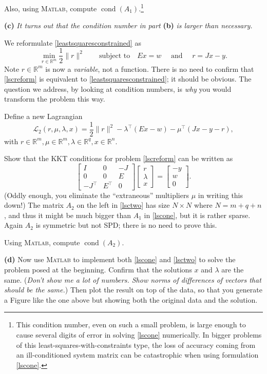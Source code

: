 \documentclass[12pt,reqno]{amsart}
\newcommand{\RR}{\mathbb{R}}
\newcommand{\cond}{\operatorname{cond}}
\newcommand{\Matlab}{\textsc{Matlab}\xspace}
\newcommand{\epart}[1]{\medskip\noindent\textbf{(#1)}\quad }
\begin{document}
Also, using \Matlab, compute $\cond(A_1)$.\footnote{This condition number, even on such a small problem, is large enough to cause several digits of error in solving \eqref{lscone} numerically.  In bigger problems of this least-squares-with-constraints type, the loss of accuracy coming from an ill-conditioned system matrix can be catastrophic when using formulation \eqref{lscone}.}

\epart{c}  \emph{It turns out that the condition number in part} \textbf{(b)} \emph{is larger than necessary.}

We reformulate \eqref{leastsquaresconstrained} as
\begin{equation}
    \min_{r\in\RR^m} \frac{1}{2} \|r\|^2 \qquad \text{subject to} \quad E x = w \quad \text{ and } \quad r = J x - y. \label{lscreform}
\end{equation}
Note $r\in \RR^m$ is now a \emph{variable}, not a function.  There is no need to confirm that \eqref{lscreform} is equivalent to \eqref{leastsquaresconstrained}; it should be obvious.  The question we address, by looking at condition numbers, is \emph{why} you would transform the problem this way.

Define a new Lagrangian
    $$\mathcal{L}_2(r,\mu,\lambda,x) = \frac{1}{2} \|r\|^2 - \lambda^\top \left(E x - w\right) - \mu^\top \left(J x - y - r\right),$$
with $r\in \RR^m, \mu\in\RR^m, \lambda \in \RR^q, x\in \RR^n$.

Show that the KKT conditions for problem \eqref{lscreform} can be written as
\begin{equation}
\begin{bmatrix}
I       &   0    & -J \\
0       &   0    &  E \\
-J^\top & E^\top &  0
\end{bmatrix}
\begin{bmatrix}
r \\ \lambda \\ x
\end{bmatrix}
=
\begin{bmatrix}
-y \\
w \\
0
\end{bmatrix}.  \label{lsctwo}
\end{equation}
(Oddly enough, you eliminate the ``extraneous'' multipliers $\mu$ in writing this down!)  The matrix $A_2$ on the left in \eqref{lsctwo} has size $N \times N$ where $N=m+q+n$, and thus it might be much bigger than $A_1$ in \eqref{lscone}, but it is rather sparse.  Again $A_2$ is symmetric but not SPD; there is no need to prove this.

Using \Matlab, compute $\cond(A_2)$.

\epart{d}  Now use \Matlab to implement both \eqref{lscone} and \eqref{lsctwo} to solve the problem posed at the beginning.  Confirm that the solutions $x$ and $\lambda$ are the same.  (\emph{Don't show me a lot of numbers.  Show norms of differences of vectors that should be the same.})  Then plot the result on top of the data, so that you generate a Figure like the one above but showing both the original data and the solution.
\end{document}
